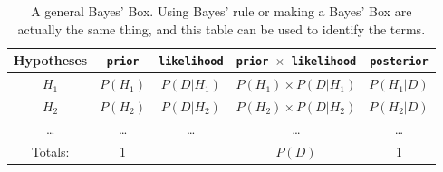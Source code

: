 \begin{table}[ht!]
\begin{center}
\begin{tabular}{|c|c|c|c|c|}
\hline
{\bf Hypotheses} & {\tt prior} & {\tt likelihood} &
{\tt prior $\times$ likelihood} & {\tt posterior}\\
\hline
$H_1$ & $P(H_1)$ & $P(D|H_1)$ & $P(H_1)\times P(D|H_1)$ & $P(H_1|D)$\\
$H_2$ & $P(H_2)$ & $P(D|H_2)$ & $P(H_2)\times P(D|H_2)$ & $P(H_2|D)$\\
\ldots & \ldots & \ldots & \ldots & \ldots\\
\hline
Totals: & 1 & & $P(D)$ & 1\\
\hline
\end{tabular}
\caption{A general Bayes' Box. Using Bayes' rule or making a Bayes' Box are
actually the same thing, and this table can be used to identify the
terms.\label{tab:general_bayes_box}}
\end{center}
\end{table}

